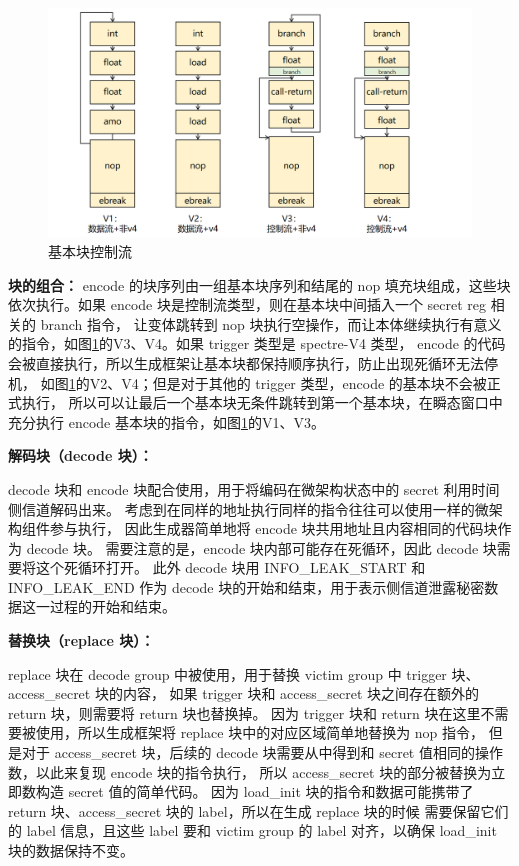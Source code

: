 \begin{figure}[!h]
    \centering
    \includegraphics[width=\linewidth]{figure/paper/encode-consist.png}
    \caption{基本块控制流}
    \label{paper:encode-consist}
\end{figure}

\textbf{块的组合：}
encode 的块序列由一组基本块序列和结尾的 nop 填充块组成，这些块依次执行。如果 encode 块是控制流类型，则在基本块中间插入一个 secret reg 相关的 branch 指令，
让变体跳转到 nop 块执行空操作，而让本体继续执行有意义的指令，如图\ref{paper:encode-consist}的V3、V4。如果 trigger 类型是 spectre-V4 类型，
encode 的代码会被直接执行，所以生成框架让基本块都保持顺序执行，防止出现死循环无法停机，
如图\ref{paper:encode-consist}的V2、V4；但是对于其他的 trigger 类型，encode 的基本块不会被正式执行，
所以可以让最后一个基本块无条件跳转到第一个基本块，在瞬态窗口中充分执行 encode 基本块的指令，如图\ref{paper:encode-consist}的V1、V3。\par

\textbf{解码块（decode 块）：}\par
decode 块和 encode 块配合使用，用于将编码在微架构状态中的 secret 利用时间侧信道解码出来。
考虑到在同样的地址执行同样的指令往往可以使用一样的微架构组件参与执行，
因此生成器简单地将 encode 块共用地址且内容相同的代码块作为 decode 块。
需要注意的是，encode 块内部可能存在死循环，因此 decode 块需要将这个死循环打开。
此外 decode 块用 INFO\_LEAK\_START 和 INFO\_LEAK\_END 作为
decode 块的开始和结束，用于表示侧信道泄露秘密数据这一过程的开始和结束。\par

\textbf{替换块（replace 块）：}\par
replace 块在 decode group 中被使用，用于替换 victim group 中 trigger 块、access\_secret 块的内容，
如果 trigger 块和 access\_secret 块之间存在额外的 return 块，则需要将 return 块也替换掉。
因为 trigger 块和 return 块在这里不需要被使用，所以生成框架将 replace 块中的对应区域简单地替换为 nop 指令，
但是对于 access\_secret 块，后续的 decode 块需要从中得到和 secret 值相同的操作数，以此来复现 encode 块的指令执行，
所以 access\_secret 块的部分被替换为立即数构造 secret 值的简单代码。
因为 load\_init 块的指令和数据可能携带了 return 块、access\_secret 块的 label，所以在生成 replace 块的时候
需要保留它们的 label 信息，且这些 label 要和 victim group 的 label 对齐，以确保 load\_init 块的数据保持不变。\par

